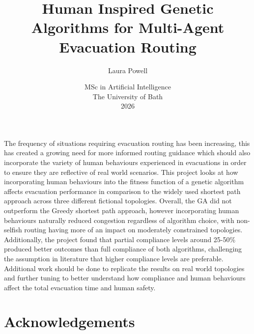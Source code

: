 \documentclass[12pt,a4paper]{report}
\title{\bf Human Inspired Genetic Algorithms for Multi-Agent Evacuation Routing}
\author{Laura Powell}
\date{MSc in Artificial Intelligence\\ 
      The University of Bath\\
      2026}
\begin{document}
\hypersetup{pageanchor=false}

\lstset{language=Java,breaklines,breakatwhitespace,basicstyle=\small}

\setcounter{page}{0}

\maketitle
\newpage
%

\newpage

\hypersetup{pageanchor=true}
\abstract
The frequency of situations requiring evacuation routing has been increasing, this has created a growing need for more informed routing guidance which should also incorporate the variety of human behaviours experienced in evacuations in order to ensure they are reflective of real world scenarios. This project looks at how incorporating human behaviours into the fitness function of a genetic algorithm affects evacuation performance in comparison to the widely used shortest path approach across three different fictional topologies. Overall, the GA did not outperform the Greedy shortest path approach, however incorporating human behaviours naturally reduced congestion regardless of algorithm choice, with non-selfish routing having more of an impact on moderately constrained topologies. Additionally, the project found that partial compliance levels around 25-50\% produced better outcomes than full compliance of both algorithms, challenging the assumption in literature that higher compliance levels are preferable. Additional work should be done to replicate the results on real world topologies and further tuning to better understand how compliance and human behaviours affect the total evacuation time and human safety.


\newpage

\tableofcontents
\newpage

\listoffigures
\newpage

\listoftables
\newpage

\chapter*{Acknowledgements}
\end{document}
